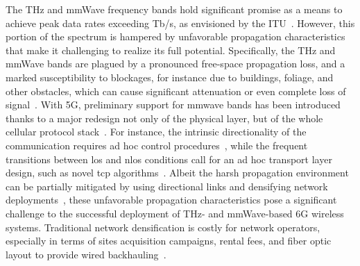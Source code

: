 The THz and mmWave frequency bands hold significant promise as a means to achieve peak data rates exceeding Tb/s, as envisioned by the ITU~\cite{imt2030}. However, this portion of the spectrum is hampered by unfavorable propagation characteristics that make it challenging to realize its full potential.
Specifically, the THz and mmWave bands are plagued by a pronounced free-space propagation loss, and a marked susceptibility to blockages, for instance due to buildings, foliage, and other obstacles, which can cause significant attenuation or even complete loss of signal~\cite{han2018propagation, jornet2011channel}.
With 5G, preliminary support for \gls{mmwave} bands has been introduced thanks to a major redesign not only of the physical layer, but of the whole cellular protocol stack~\cite{shafi2018microwave}. For instance, the intrinsic directionality of the communication requires ad hoc control procedures~\cite{heng2021six}, while the frequent transitions between \gls{los} and \gls{nlos} conditions call for an ad hoc transport layer design, such as novel \gls{tcp} algorithms~\cite{zhang2019will}. 
Albeit the harsh propagation environment can be partially mitigated by using directional links and densifying network deployments~\cite{polese2020toward}, these unfavorable propagation characteristics pose a significant challenge to the successful deployment of THz- and mmWave-based 6G wireless systems. Traditional network densification is costly for network operators,
especially in terms of sites acquisition campaigns, rental fees, and fiber optic layout to provide wired backhauling~\cite{lopez2015towards}.

